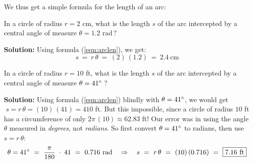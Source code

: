 We thus get a simple formula for the length of an arc:

\begin{center}\end{center}

\begin{exmp}
 In a circle of radius $r=2$ cm, what is the length $s$ of the arc intercepted by a central angle of
 measure $\theta = 1.2$ rad\,?\vspace{1mm}
 \par\noindent\textbf{Solution:} Using formula (\ref{eqn:arclen}), we get:
 \begin{displaymath}
  s ~=~ r\,\theta ~=~ (2)\,(1.2) ~=~ \boxed{2.4~\text{cm}}
 \end{displaymath}
\end{exmp}
\begin{exmp}
 In a circle of radius $r=10$ ft, what is the length $s$ of the arc intercepted by a central angle
 of measure $\theta = 41^\circ\;$?\vspace{1mm}
 \par\noindent\textbf{Solution:} Using formula (\ref{eqn:arclen}) blindly with $\theta = 41^\circ$,
 we would get $\;s = r\,\theta = (10)\,(41) = 410$ ft. But this impossible, since a circle of
 radius $10$ ft has a circumference of only $2\pi\,(10) \approx 62.83$ ft! Our error was in using
 the angle $\theta$ measured in \emph{degrees}, not \emph{radians}. So first convert $\theta =
 41^\circ$ to radians, then use $s=r\,\theta$:
 \begin{displaymath}
 \theta = 41^\circ ~=~ \frac{\pi}{180} \;\cdot\; 41 ~=~ 0.716~\text{rad}
  \quad\Rightarrow\quad s ~=~ r\,\theta ~=~ (10)\,(0.716) ~=~ \boxed{7.16~\text{ft}}
 \end{displaymath}
\end{exmp}
\divider
\vspace{1mm}

